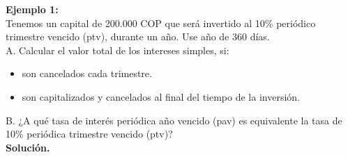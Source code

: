 \textbf{Ejemplo 1:}\\
Tenemos un capital de 200{.}000 COP que será invertido al 10\% 
periódico trimestre vencido (ptv), durante un año. Use año de 360 días.\\

A. Calcular el valor total de los intereses simples, si:
\begin{itemize}
  \item son cancelados cada trimestre.
  \item son capitalizados y cancelados al final del tiempo de la inversión.
\end{itemize}
B. ¿A qué tasa de interés periódica año vencido (pav) es equivalente la tasa de 10\% 
periódica trimestre vencido (ptv)?\\


\textbf{Solución.}\\

